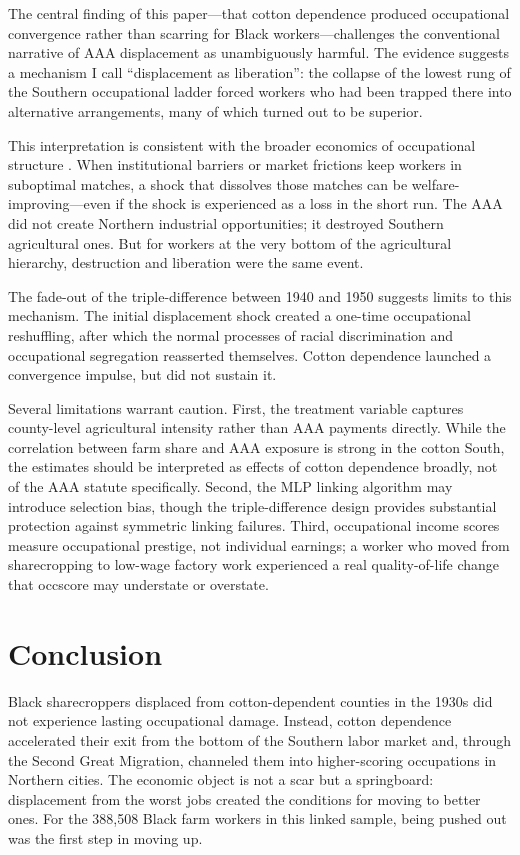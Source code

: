 \documentclass[12pt]{article}
\begin{document}
The central finding of this paper---that cotton dependence produced occupational convergence rather than scarring for Black workers---challenges the conventional narrative of AAA displacement as unambiguously harmful. The evidence suggests a mechanism I call ``displacement as liberation'': the collapse of the lowest rung of the Southern occupational ladder forced workers who had been trapped there into alternative arrangements, many of which turned out to be superior.

This interpretation is consistent with the broader economics of occupational structure \citep{goldin2000orchestrating}. When institutional barriers or market frictions keep workers in suboptimal matches, a shock that dissolves those matches can be welfare-improving---even if the shock is experienced as a loss in the short run. The AAA did not create Northern industrial opportunities; it destroyed Southern agricultural ones. But for workers at the very bottom of the agricultural hierarchy, destruction and liberation were the same event.

The fade-out of the triple-difference between 1940 and 1950 suggests limits to this mechanism. The initial displacement shock created a one-time occupational reshuffling, after which the normal processes of racial discrimination and occupational segregation reasserted themselves. Cotton dependence launched a convergence impulse, but did not sustain it.

Several limitations warrant caution. First, the treatment variable captures county-level agricultural intensity rather than AAA payments directly. While the correlation between farm share and AAA exposure is strong in the cotton South, the estimates should be interpreted as effects of cotton dependence broadly, not of the AAA statute specifically. Second, the MLP linking algorithm may introduce selection bias, though the triple-difference design provides substantial protection against symmetric linking failures. Third, occupational income scores measure occupational prestige, not individual earnings; a worker who moved from sharecropping to low-wage factory work experienced a real quality-of-life change that occscore may understate or overstate.

\section{Conclusion}

Black sharecroppers displaced from cotton-dependent counties in the 1930s did not experience lasting occupational damage. Instead, cotton dependence accelerated their exit from the bottom of the Southern labor market and, through the Second Great Migration, channeled them into higher-scoring occupations in Northern cities. The economic object is not a scar but a springboard: displacement from the worst jobs created the conditions for moving to better ones. For the 388,508 Black farm workers in this linked sample, being pushed out was the first step in moving up.
\end{document}
